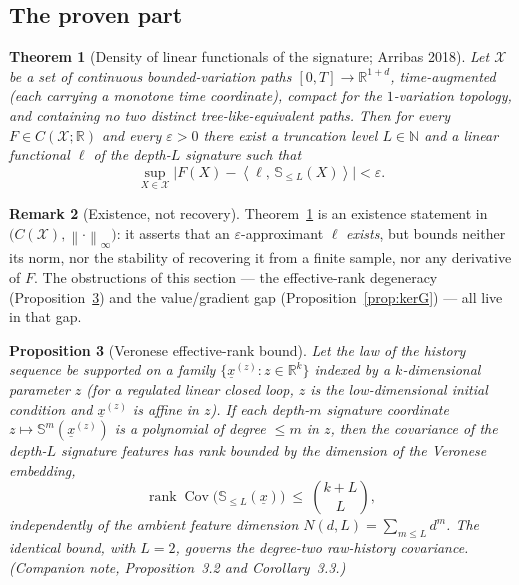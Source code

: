\documentclass[11pt]{article}
\renewcommand{\_}{\discretionary{\textunderscore}{}{\textunderscore}}
\theoremstyle{plain}
\newtheorem{theorem}{Theorem}[section]
\newtheorem{proposition}[theorem]{Proposition}
\theoremstyle{definition}
\newtheorem{remark}[theorem]{Remark}
\newcommand{\R}{\mathbb{R}}
\newcommand{\N}{\mathbb{N}}
\newcommand{\sig}{\mathbb{S}}
\newcommand{\rank}{\operatorname{rank}}
\newcommand{\Cov}{\operatorname{Cov}}
\newcommand{\norm}[1]{\left\lVert #1 \right\rVert}
\newcommand{\inner}[2]{\left\langle #1,\, #2 \right\rangle}
\begin{document}
\subsection{The proven part}

\begin{theorem}[Density of linear functionals of the signature; Arribas 2018]\label{thm:density}
Let $\mathcal X$ be a set of continuous bounded-variation paths $[0,T]\to\R^{1+d}$, time-augmented
(each carrying a monotone time coordinate), compact for the $1$-variation topology, and containing
no two distinct tree-like-equivalent paths. Then for every $F\in C(\mathcal X;\R)$ and every
$\varepsilon>0$ there exist a truncation level $L\in\N$ and a linear functional $\ell$ of the
depth-$L$ signature such that
\[
\sup_{X\in\mathcal X}\big|F(X)-\inner{\ell}{\sig_{\le L}(X)}\big|<\varepsilon .
\]
\end{theorem}

\begin{remark}[Existence, not recovery]\label{rem:density}
Theorem~\ref{thm:density} is an existence statement in
$\big(C(\mathcal X),\norm{\cdot}_{\infty}\big)$: it asserts that an $\varepsilon$-approximant $\ell$
\emph{exists}, but bounds neither its norm, nor the stability of recovering it from a finite sample,
nor any derivative of $F$. The obstructions of this section --- the effective-rank degeneracy
(Proposition~\ref{prop:veronese}) and the value/gradient gap (Proposition~\ref{prop:kerG}) --- all
live in that gap.
\end{remark}

\begin{proposition}[Veronese effective-rank bound]\label{prop:veronese}
Let the law of the history sequence be supported on a family
$\{\underline x^{(z)}:z\in\R^{k}\}$ indexed by a $k$-dimensional parameter $z$ (for a regulated linear
closed loop, $z$ is the low-dimensional initial condition and $\underline x^{(z)}$ is affine in $z$). If
each depth-$m$ signature coordinate $z\mapsto\sig^{m}(\underline x^{(z)})$ is a polynomial of degree
$\le m$ in $z$, then the covariance of the depth-$L$ signature features has rank bounded by the
dimension of the Veronese embedding,
\[
\rank\Cov\big(\sig_{\le L}(\underline x)\big)\ \le\ \binom{k+L}{L},
\]
\emph{independently of the ambient feature dimension} $N(d,L)=\sum_{m\le L}d^{m}$. The identical
bound, with $L=2$, governs the degree-two raw-history covariance. (Companion note,
Proposition~3.2 and Corollary~3.3.)
\end{proposition}
\end{document}
